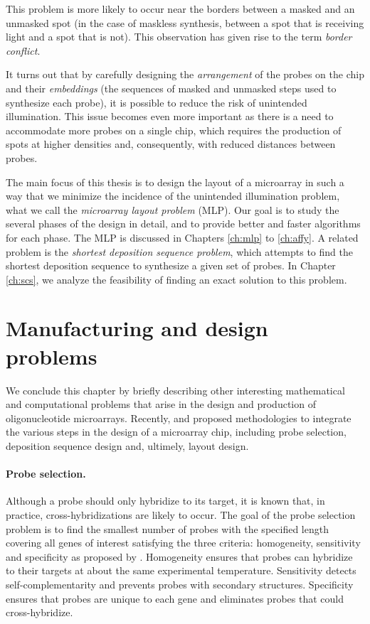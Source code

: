 This problem is more likely to occur near the borders between a masked and an
unmasked spot (in the case of maskless synthesis, between a spot that is
receiving light and a spot that is not). This observation has given rise to the
term \emph{border conflict}.

It turns out that by carefully designing the \emph{arrangement} of the probes on
the chip and their \emph{embeddings} (the sequences of masked and unmasked steps
used to synthesize each probe), it is possible to reduce the risk of unintended
illumination. This issue becomes even more important as there is a need to
accommodate more probes on a single chip, which requires the production of spots
at higher densities and, consequently, with reduced distances between probes.

The main focus of this thesis is to design the layout of a microarray in such a
way that we minimize the incidence of the unintended illumination problem, what
we call the \emph{microarray layout problem} (MLP). Our goal is to study the
several phases of the design in detail, and to provide better and faster
algorithms for each phase. The MLP is discussed in Chapters \ref{ch:mlp} to
\ref{ch:affy}. A related problem is the \emph{shortest deposition sequence
problem}, which attempts to find the shortest deposition sequence to synthesize
a given set of probes. In Chapter \ref{ch:scs}, we analyze the feasibility of
finding an exact solution to this problem.

\section{Manufacturing and design problems}
\label{sec:intro_problems}

We conclude this chapter by briefly describing other interesting mathematical
and computational problems that arise in the design and production of
oligonucleotide microarrays. Recently, \citet{Kahng2003b,Kahng2006} and
\citet{Atlas2004} proposed methodologies to integrate the various steps in the
design of a microarray chip, including probe selection, deposition sequence
design and, ultimely, layout design.

\paragraph{Probe selection.} Although a probe should only hybridize to its
target, it is known that, in practice, cross-hybridizations are likely to occur.
The goal of the probe selection problem is to find the smallest number of probes
with the specified length covering all genes of interest satisfying the three
criteria: homogeneity, sensitivity and specificity as proposed by
\citet{Lockhart1996}. Homogeneity ensures that probes can hybridize to their
targets at about the same experimental temperature. Sensitivity detects
self-complementarity and prevents probes with secondary structures. Specificity
ensures that probes are unique to each gene and eliminates probes that could
cross-hybridize.

